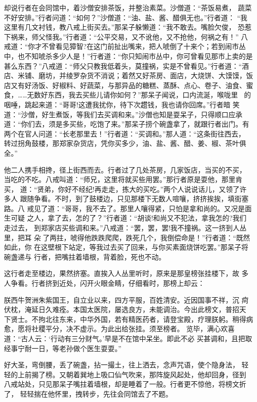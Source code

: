 却说行者在会同馆中，着沙僧安排茶饭，并整治素菜。沙僧道：“茶饭易煮，
蔬菜不好安排。”行者问道：“如何？”沙僧道：“油、盐、酱、醋俱无也。”行者道：
“我这里有几文衬钱，教八戒上街买去。”那呆子躲懒道：“我不敢去。嘴脸欠俊，
恐惹下祸来，师父怪我。”行者道：“公平交易，又不讹他，又不抢他，何祸之有！”
八戒道：“你才不曾看见獐智?在这门前扯出嘴来，把人唬倒了十来个；若到闹市丛
中，也不知唬杀多少人是！”行者道：“你只知闹市丛中，你可曾看见那市上卖的是
甚么东西？”八戒道：“师父只教我低着头，莫撞祸，实是不曾看见。”行者道：“酒
店、米铺、磨坊，并绫罗杂货不消说；着然又好茶房、面店，大烧饼、大馍馍，饭
店又有好汤饭、好椒料、好蔬菜，与那异品的糖糕、蒸酥、点心、卷子、油食、蜜
食，……无数好东西，我去买些儿请你如何？”那呆子闻说，口内流涎，喉咙里
的咽唾，跳起来道：“哥哥!这遭我扰你，待下次趱钱，我也请你回席。”行者暗
笑道：“沙僧，好生煮饭，等我们去买调和来。”沙僧也知是耍呆子，只得顺口应承
道：“你们去，须是多买些，吃饱了来。”那呆子捞个碗盏拿了，就跟行者出门。有
两个在官人问道：“长老那里去！”行者道：“买调和。”那人道：“这条街往西去，
转过拐角鼓楼，那郑家杂货店，凭你买多少，油、盐、酱、醋、姜、椒、茶叶俱全。”

他二人携手相搀，径上街西而去。行者过了几处茶房，几家饭店，当买的不买，
当吃的不吃。八戒叫道：“师兄，这里将就买些用罢。”那行者原是耍他，那里肯买，
道：“贤弟，你好不经纪!再走走，拣大的买吃。”两个人说说话儿，又领了许多人
跟随争看。不时，到了鼓楼边，只见那楼下无数人喧嚷，挤挤挨挨，填街塞路。八
戒见了道：“哥哥，我不去了。那里人嚷得紧，只怕是拿和尚的。又况是面生可疑
之人，拿了去，怎的了？”行者道：“胡谈!和尚又不犯法，拿我怎的?我们走过去，
到郑家店买些调和来。”八戒道：“罢，罢，罢!我不撞祸。这一挤到人丛里，把耳
朵了两拄，唬得他跌跌爬爬，跌死几个，我倒偿命是！”行者道：“既然如此，你
在这壁根下站定，等我过去买了回来，与你买素面烧饼吃罢。”那呆子将碗盏递与
行者，把嘴拄着墙根，背着脸，死也不动。

这行者走至楼边，果然挤塞。直挨入人丛里听时，原来是那皇榜张挂楼下，故
多人争看。行者挤到近处，闪开火眼金睛，仔细看时，那榜上却云：

朕西牛贺洲朱紫国王，自立业以来，四方平服，百姓清安。近因国事不祥，沉
疴伏枕，淹延日久难痊。本国太医院，屡选良方，未能调治。今出此榜文，普招天
下贤士。不拘北往东来，中华外国，若有精医药者，请登宝殿，疗理朕躬。稍得病
愈，愿将社稷平分，决不虚示。为此出给张挂。须至榜者。
览毕，满心欢喜道：“古人云：‘行动有三分财气。’早是不在馆中呆坐。即此不必
买甚调和，且把取经事宁耐一日，等老孙做个医生耍耍。”

好大圣，弯倒腰，丢了碗盏，拈一撮土，往上洒去，念声咒语，使个隐身法，
轻轻的上前揭了榜。又朝着巽地上吸口仙气吹来，那阵旋风起处，他却回身，径到
八戒站处，只见那呆子嘴拄着墙根，却是睡着了一般。行者更不惊他，将榜文折了，
轻轻揣在他怀里，拽转步，先往会同馆去了不题。

